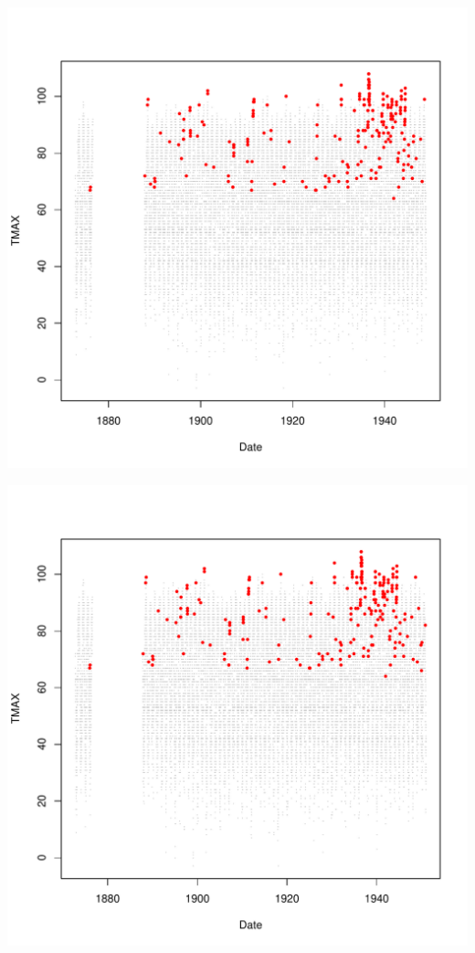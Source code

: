 \documentclass{article}\usepackage[]{graphicx}\usepackage[]{color}
\makeatletter
\def\maxwidth{ %
  \ifdim\Gin@nat@width>\linewidth
    \linewidth
  \else
    \Gin@nat@width
  \fi
}
\newenvironment{knitrout}{}{} %
\makeatother
\begin{document}
\begin{knitrout}
\includegraphics[width=\maxwidth]{figure/unnamed-chunk-4-34} 

\includegraphics[width=\maxwidth]{figure/unnamed-chunk-4-35} 


\end{knitrout}
\end{document}
